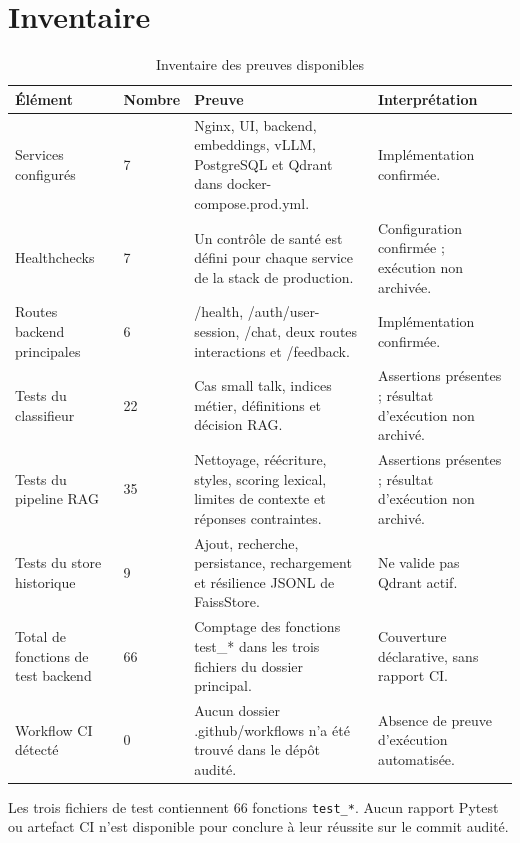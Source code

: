 \section{Inventaire}
\begin{table}[H]
\centering
\caption{Inventaire des preuves disponibles}
\label{tab:inventory_ch7}
\begin{tabular}{p{3.1cm}p{1.3cm}p{5.2cm}p{4.0cm}}
\toprule
\textbf{Élément} & \textbf{Nombre} & \textbf{Preuve} & \textbf{Interprétation} \\
\midrule
Services configurés & 7 & Nginx, UI, backend, embeddings, vLLM, PostgreSQL et Qdrant dans docker-compose.prod.yml. & Implémentation confirmée. \\
Healthchecks & 7 & Un contrôle de santé est défini pour chaque service de la stack de production. & Configuration confirmée ; exécution non archivée. \\
Routes backend principales & 6 & /health, /auth/user-session, /chat, deux routes interactions et /feedback. & Implémentation confirmée. \\
Tests du classifieur & 22 & Cas small talk, indices métier, définitions et décision RAG. & Assertions présentes ; résultat d’exécution non archivé. \\
Tests du pipeline RAG & 35 & Nettoyage, réécriture, styles, scoring lexical, limites de contexte et réponses contraintes. & Assertions présentes ; résultat d’exécution non archivé. \\
Tests du store historique & 9 & Ajout, recherche, persistance, rechargement et résilience JSONL de FaissStore. & Ne valide pas Qdrant actif. \\
Total de fonctions de test backend & 66 & Comptage des fonctions test\_* dans les trois fichiers du dossier principal. & Couverture déclarative, sans rapport CI. \\
Workflow CI détecté & 0 & Aucun dossier .github/workflows n’a été trouvé dans le dépôt audité. & Absence de preuve d’exécution automatisée. \\
\bottomrule
\end{tabular}
\end{table}
Les trois fichiers de test contiennent 66 fonctions \texttt{test\_*}. Aucun rapport Pytest ou artefact CI n'est disponible pour conclure à leur réussite sur le commit audité.


